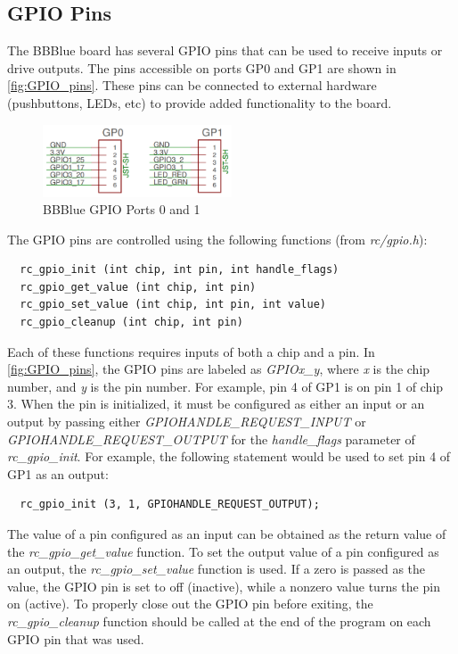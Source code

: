 \subsection{GPIO Pins}
\label{sec:GPIOPins}
The BBBlue board has several GPIO pins that can be used to receive inputs or drive outputs. The pins accessible on ports GP0 and GP1 are shown in \autoref{fig:GPIO_pins}. These pins can be connected to external hardware (pushbuttons, LEDs, etc) to provide added functionality to the board.
%
\begin{figure}
  \centering
  \includegraphics[width= 0.5\textwidth]{figs/img/Lab1/GPIO_pins.png}
  \caption{BBBlue GPIO Ports 0 and 1}
  \label{fig:GPIO_pins}
\end{figure}
%
The GPIO pins are controlled using the following functions (from \emph{rc/gpio.h}):
\begin{verbatim}
  rc_gpio_init (int chip, int pin, int handle_flags)
  rc_gpio_get_value (int chip, int pin)
  rc_gpio_set_value (int chip, int pin, int value)
  rc_gpio_cleanup (int chip, int pin)
\end{verbatim}
Each of these functions requires inputs of both a chip and a pin. In \autoref{fig:GPIO_pins}, the GPIO pins are labeled as \emph{GPIOx\_y}, where \emph{x} is the chip number, and \emph{y} is the pin number. For example, pin 4 of GP1 is on pin 1 of chip 3. When the pin is initialized, it must be configured as either an input or an output by passing either \emph{GPIOHANDLE\_REQUEST\_INPUT} or \emph{GPIOHANDLE\_REQUEST\_OUTPUT} for the \emph{handle\_flags} parameter of \emph{rc\_gpio\_init}. For example, the following statement would be used to set pin 4 of GP1 as an output:
\begin{verbatim}
  rc_gpio_init (3, 1, GPIOHANDLE_REQUEST_OUTPUT);
\end{verbatim}
The value of a pin configured as an input can be obtained as the return value of the \emph{rc\_gpio\_get\_value} function. To set the output value of a pin configured as an output, the \emph{rc\_gpio\_set\_value} function is used. If a zero is passed as the value, the GPIO pin is set to off (inactive), while a nonzero value turns the pin on (active). To properly close out the GPIO pin before exiting, the \emph{rc\_gpio\_cleanup} function should be called at the end of the program on each GPIO pin that was used.

